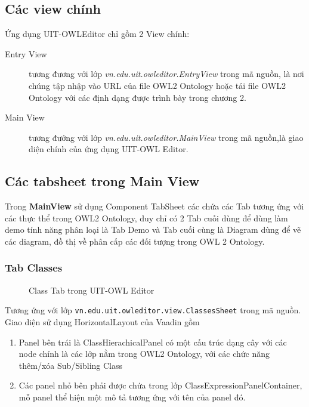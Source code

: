 \subsection{Các view chính}
Ứng dụng UIT-OWLEditor chỉ gồm 2 View chính:
\begin{description}
\item[Entry View] tương đương với lớp \textit{vn.edu.uit.owleditor.EntryView} trong mã nguồn, là nơi chúng tập nhập vào URL của file OWL2 Ontology hoặc tải file OWL2 Ontology với các định dạng được trình bày trong chương 2.
\item[Main View] tương đướng với lớp \textit{vn.edu.uit.owleditor.MainView} trong mã nguồn,là giao diện chính của ứng dụng UIT-OWL Editor.
\end{description}
%
\subsection{Các tabsheet trong Main View}
Trong \textbf{MainView} sử dụng Component TabSheet các chứa các Tab tương ứng với các thực thể trong OWL2 Ontology, duy chỉ có 2 Tab cuối dùng để dùng làm demo tính năng phân loại là Tab Demo và Tab cuối cùng là Diagram dùng để vẽ các diagram, đồ thị về phân cấp các đối tượng trong OWL 2 Ontology.

\subsubsection{Tab Classes} 
\begin{figure}[h!]
	\centering
	\caption{Class Tab trong UIT-OWL Editor\label{overflow}}
\end{figure}
Tương ứng với lớp \verb|vn.edu.uit.owleditor.view.ClassesSheet| trong mã nguồn. Giao diện sử dụng HorizontalLayout của Vaadin gồm 
\begin{enumerate}
\item Panel bên trái là ClassHierachicalPanel có một cấu trúc dạng cây với các node chính là các lớp nằm trong OWL2 Ontology, với các chức năng thêm/xóa Sub/Sibling Class 
\item Các panel nhỏ bên phải được chứa trong lớp ClassExpressionPanelContainer, mỗ panel thể hiện một mô tả tương ứng với tên của panel đó.
\end{enumerate}	

